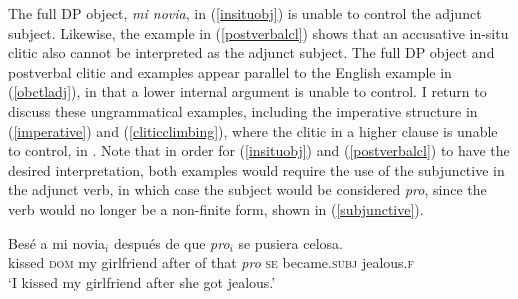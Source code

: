 \documentclass[output=paper,colorlinks,citecolor=brown]{langscibook}
\begin{document}
\ea \label{ungrammatical}
\label{insituobj}
\label{postverbalcl}
\label{imperative}
\label{cliticclimbing}
\z
\z

 The full DP object, \textit{mi novia}, in (\ref{insituobj}) is unable to control the adjunct subject. Likewise, the example in (\ref{postverbalcl}) shows that an accusative in-situ clitic also cannot be interpreted as the adjunct subject.  The full DP object and postverbal clitic and examples appear parallel to the English example in (\ref{obctladj}), in that a lower internal argument is unable to control. I return to discuss these ungrammatical examples, including the imperative structure in (\ref{imperative}) and (\ref{cliticclimbing}), where the clitic in a higher clause is unable to control, in . Note that in order for (\ref{insituobj}) and (\ref{postverbalcl}) to have the desired interpretation, both examples would require the use of the subjunctive in the adjunct verb, in which case the subject would be considered \textit{pro}, since the verb would no longer be a non-finite form, shown in (\ref{subjunctive}).

\ea \label{subjunctive}
\gll Besé a mi novia$_i$ después de que \textit{pro$_i$} se pusiera celosa.\\
kissed \textsc{dom} my girlfriend after of that \textit{pro} \textsc{se} became.\textsc{subj} jealous.\textsc{f}\\
\glt ‘I kissed my girlfriend after she got jealous.’
\z
\end{document}
